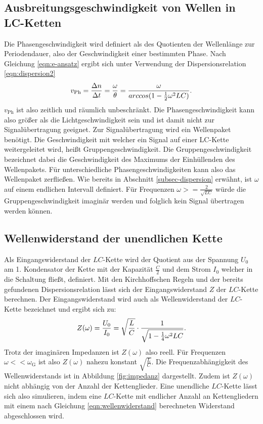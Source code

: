 \subsection{Ausbreitungsgeschwindigkeit von Wellen in LC-Ketten}
Die Phasengeschwindigkeit wird definiert als des Quotienten der Wellenlänge zur Periodendauer, also der Geschwindigkeit einer bestimmten Phase.
Nach Gleichung \eqref{eqn:e-ansatz} ergibt sich unter Verwendung der Dispersionsrelation  \eqref{eqn:dispersion2}
\begin{equation}
\centering
\label{eqn:v-phase}
v_{\mathrm{Ph}}=\frac{ \Delta n}{ \Delta t}=\frac{\omega}{\theta}=\frac{\omega}{arccos(1-\frac{1}{2}\omega^2LC)}.
\end{equation}
$v_{\mathrm{Ph}}$ ist also zeitlich und räumlich unbeschränkt. Die Phasengeschwindigkeit kann also größer als die Lichtgeschwindigkeit sein und ist damit nicht zur Signalübertragung geeignet.
Zur Signalübertragung wird ein Wellenpaket benötigt.
Die Geschwindigkeit mit welcher ein Signal auf einer LC-Kette weitergeleitet wird, heißt Gruppengeschwindigkeit.
Die Gruppengeschwindigkeit bezeichnet dabei die Geschwindigkeit des Maximums der Einhüllenden des Wellenpakets.
Für unterschiedliche Phasengeschwindigkeiten kann also das Wellenpaket zerfließen.
Wie bereits in Abschnitt \ref{subsec-dispersion} erwähnt, ist $\omega$ auf einem endlichen Intervall definiert.
Für Frequenzen $\omega>=\frac{2}{\sqrt{LC}}$ würde die Gruppengeschwindigkeit imaginär werden und folglich kein Signal übertragen werden können.
\subsection{Wellenwiderstand der unendlichen Kette}
Als Eingangswiderstand der $LC$-Kette wird der Quotient aus der Spannung $U_{\mathrm{0}}$ am 1. Kondensator der Kette mit der Kapazität $\frac{C}{2}$ und dem Strom $I_{\mathrm{0}}$ welcher in die Schaltung fließt, definiert.
Mit den Kirchhoffschen Regeln und der bereits gefundenen Dispersionsrelation lässt sich der Eingangswiderstand $Z$ der $LC$-Kette berechnen.
Der Eingangswiderstand wird auch als Wellenwiderstand der $LC$-Kette bezeichnet und ergibt sich zu:
\begin{equation}
\centering
\label{eqn:wellenwiderstand}
Z(\omega)=\frac{U_{\mathrm{0}}}{I_{\mathrm{0}}}=\sqrt{\frac{L}{C}}\cdot \frac{1}{\sqrt{1-\frac{1}{4}\omega^2LC}}.
\end{equation}
Trotz der imaginären Impedanzen ist $Z(\omega)$ also reell.
Für Frequenzen $\omega<<\omega_{\mathrm{G}}$ ist also $Z(\omega)$ nahezu konstant $\sqrt{\frac{L}{C}}$.
Die Frequenzabhängigkeit des Wellenwiderstands ist in Abbildung \ref{fig:impedanz} dargestellt.
Zudem ist $Z(\omega)$ nicht abhängig von der Anzahl der Kettenglieder. Eine unendliche $LC$-Kette lässt sich also simulieren, indem eine $LC$-Kette mit endlicher Anzahl an Kettengliedern mit einem nach Gleichung \eqref{eqn:wellenwiderstand} berechneten Widerstand abgeschlossen wird.

